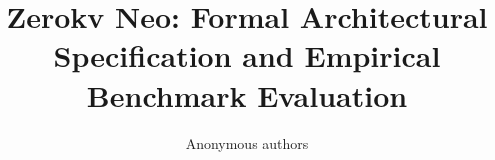 \title{\textbf{Zerokv Neo: Formal Architectural Specification and Empirical Benchmark Evaluation}}

\author{Anonymous authors}
